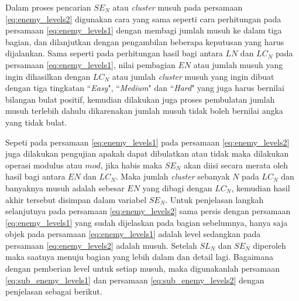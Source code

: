 Dalam proses pencarian $SE_{N}$ atau \textit{cluster} musuh pada persamaan \ref{eq:enemy_levels2} digunakan cara yang sama seperti cara perhitungan pada persamaan \ref{eq:enemy_levels1} dengan membagi jumlah musuh ke dalam tiga bagian, dan dilanjutkan dengan pengambilan beberapa keputusan yang harus dijalankan. Sama seperti pada perhitungan hasil bagi antara $LN$ dan $LC_{N}$ pada persamaan \ref{eq:enemy_levels1}, nilai pembagian $EN$ atau jumlah musuh yang ingin dihasilkan dengan $LC_{N}$ atau jumlah \textit{cluster} musuh yang ingin dibuat dengan tiga tingkatan ``\textit{Easy}", ``\textit{Medium}" dan ``\textit{Hard}" yang juga harus bernilai bilangan bulat positif, kemudian dilakukan juga proses pembulatan jumlah musuh terlebih dahulu dikarenakan jumlah musuh tidak boleh bernilai angka yang tidak bulat. 
\vspace{1ex}

Sepeti pada persamaan \ref{eq:enemy_levels1} pada persamaan \ref{eq:enemy_levels2} juga dilakukan pengujian apakah dapat dibulatkan atau tidak maka dilakukan operasi modulus atau $mod$, jika habis maka $SE_{N}$ akan diisi secara merata oleh hasil bagi antara $EN$ dan $LC_{N}$. Maka jumlah \textit{cluster} sebanyak $N$ pada $LC_{N}$ dan banyaknya musuh adalah sebesar $EN$ yang dibagi dengan $LC_{N}$, kemudian hasil akhir tersebut disimpan dalam variabel $SE_{N}$. Untuk penjelasan langkah selanjutnya pada persamaan \ref{eq:enemy_levels2} sama persis dengan persamaan \ref{eq:enemy_levels1} yang sudah dijelaskan pada bagian sebelumnya, hanya saja objek pada persamaan \ref{eq:enemy_levels1} adalah level sedangkan pada persamaan \ref{eq:enemy_levels2} adalah musuh. Setelah $SL_{N}$ dan $SE_{N}$ diperoleh maka saatnya menuju bagian yang lebih dalam dan detail lagi. Bagaimana dengan pemberian level untuk setiap musuh, maka digunakanlah persamaan \ref{eq:sub_enemy_levels1} dan persamaan \ref{eq:sub_enemy_levels2} dengan penjelasan sebagai berikut.
\vspace{1ex}

